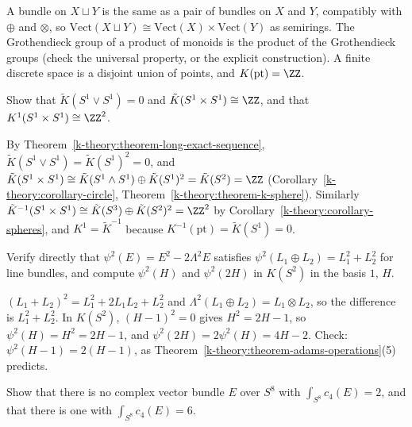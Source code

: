 \begin{solution}
A bundle on $X \sqcup Y$ is the same as a pair of bundles on $X$ and $Y$, compatibly with $\oplus$ and $\otimes$, so $\mathrm{Vect}(X \sqcup Y) \cong \mathrm{Vect}(X) \times \mathrm{Vect}(Y)$ as semirings. The
Grothendieck group of a product of monoids is the product of the Grothendieck groups (check the universal property, or the explicit construction). A finite discrete space is a disjoint union of points, and
$K(\mathrm{pt}) = \ZZ$.
\end{solution}

\begin{exercise}\label{k-theory:exercise-torus}
Show that $\tilde{K}(S^1 \vee S^1) = 0$ and $\tilde{K}(S^1 \times S^1) \cong \ZZ$, and that $K^1(S^1 \times S^1) \cong \ZZ^2$.
\end{exercise}

\begin{solution}
By Theorem~\ref{k-theory:theorem-long-exact-sequence}, $\tilde{K}(S^1 \vee S^1) = \tilde{K}(S^1)^2 = 0$, and
$\tilde{K}(S^1 \times S^1) \cong \tilde{K}(S^1 \wedge S^1) \oplus \tilde{K}(S^1)^2 = \tilde{K}(S^2) = \ZZ$ (Corollary~\ref{k-theory:corollary-circle}, Theorem~\ref{k-theory:theorem-k-sphere}). Similarly
$\tilde{K}^{-1}(S^1 \times S^1) \cong \tilde{K}(S^3) \oplus \tilde{K}(S^2)^2 = \ZZ^2$ by Corollary~\ref{k-theory:corollary-spheres}, and $K^1 = \tilde{K}^{-1}$ because $K^{-1}(\mathrm{pt}) = \tilde{K}(S^1) = 0$.
\end{solution}

\begin{exercise}\label{k-theory:exercise-psi-two}
Verify directly that $\psi^2(E) = E^2 - 2\Lambda^2E$ satisfies $\psi^2(L_1 \oplus L_2) = L_1^2 + L_2^2$ for line bundles, and compute $\psi^2(H)$ and $\psi^2(2H)$ in $K(S^2)$ in the basis $1$, $H$.
\end{exercise}

\begin{solution}
$(L_1 + L_2)^2 = L_1^2 + 2L_1L_2 + L_2^2$ and $\Lambda^2(L_1 \oplus L_2) = L_1 \otimes L_2$, so the difference is $L_1^2 + L_2^2$. In $K(S^2)$, $(H - 1)^2 = 0$ gives $H^2 = 2H - 1$, so $\psi^2(H) = H^2 = 2H - 1$, and
$\psi^2(2H) = 2\psi^2(H) = 4H - 2$. Check: $\psi^2(H - 1) = 2(H - 1)$, as Theorem~\ref{k-theory:theorem-adams-operations}(5) predicts.
\end{solution}

\begin{exercise}\label{k-theory:exercise-integrality-eight}
Show that there is no complex vector bundle $E$ over $S^8$ with $\int_{S^8}c_4(E) = 2$, and that there is one with $\int_{S^8}c_4(E) = 6$.
\end{exercise}

